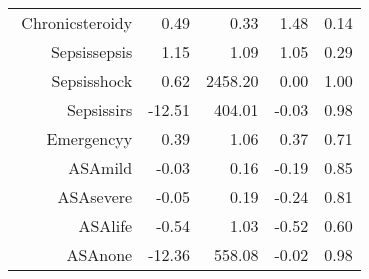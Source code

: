 \begin{tabular}{rrrrr}
$$  Chronic\-steroid\-y & 0.49 & 0.33 & 1.48 & 0.14 \\ 
  Sepsis\-sepsis & 1.15 & 1.09 & 1.05 & 0.29 \\ 
  Sepsis\-shock & 0.62 & 2458.20 & 0.00 & 1.00 \\ 
  Sepsis\-sirs & -12.51 & 404.01 & -0.03 & 0.98 \\ 
  Emergency\-y & 0.39 & 1.06 & 0.37 & 0.71 \\ 
  ASA\-mild & -0.03 & 0.16 & -0.19 & 0.85 \\ 
  ASA\-severe & -0.05 & 0.19 & -0.24 & 0.81 \\ 
  ASA\-life & -0.54 & 1.03 & -0.52 & 0.60 \\ 
  ASA\-none & -12.36 & 558.08 & -0.02 & 0.98 \\ 
   \hline
\end{tabular}

